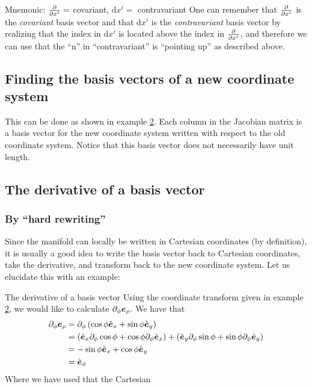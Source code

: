 \documentclass[a4paper, 12pt]{article}
\begin{document}
\vspace{0.5cm}
\begin{greenbox}{Mnemonic: $\frac{\partial {}}{\partial{x^i}} = $ covariant,  $\text{d}x^i = $
contravariant }
 One can remember that $\frac{\partial {}}{\partial{x^i}}$ is the \emph{covariant} basis vector
and that $\text{d}x^i$ is the \emph{contravariant} basis vector by realizing
that the index in $\text{d}x^i$ is located above the index in $\frac{\partial {}}{\partial{x^i}}$,
and therefore we can use that the ``n'' in ``contravariant'' is ``pointing up''
as described above.
\end{greenbox}


\subsection{Finding the basis vectors of a new coordinate system}
This can be done as shown in example \hyperref[ex:vft]{2}. Each column in the
Jacobian matrix is a basis vector for the new coordinate system written with
respect to the old coordinate system. Notice that this basis vector does not
necessarily have unit length.




\subsection{The derivative of a basis vector}
\subsubsection{By ``hard rewriting''}
Since the manifold can locally be written in Cartesian coordinates
(by definition), it is usually a good idea to write the basis vector back to
Cartesian coordinates, take the derivative, and transform back to the new
coordinate system. Let us elucidate this with an example:

\begin{example}{The derivative of a basis vector}
 Using the coordinate transform given in example \hyperref[ex:vft]{2}, we would
 like to calculate $\partial_\phi \boldsymbol{e}_\rho$. We have that
 \begin{align*}
  \partial_\phi \boldsymbol{e}_\rho &= \partial_\phi
\left(\cos\phi\hat{\boldsymbol{e}}_x+\sin\phi\hat{\boldsymbol{e}}_y\right)\\
    &= \left(\hat{\boldsymbol{e}}_x\partial_\phi \cos\phi + \cos\phi \partial_\phi \hat{\boldsymbol{e}}_x\right)
      +\left(\hat{\boldsymbol{e}}_y\partial_\phi \sin\phi + \sin\phi \partial_\phi \hat{\boldsymbol{e}}_y\right)\\
    &= - \sin\phi\hat{\boldsymbol{e}}_x + \cos\phi\hat{\boldsymbol{e}}_y\\
    &= \hat{\boldsymbol{e}}_\phi
 \end{align*}
 Where we have used that the Cartesian
\end{example}
%
\end{document}
